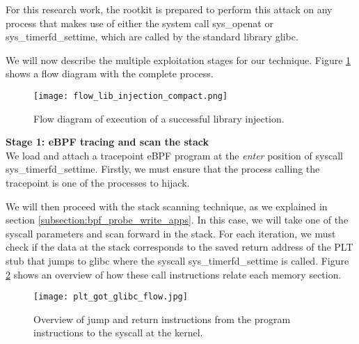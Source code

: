 For this research work, the rootkit is prepared to perform this attack on any process that makes use of either the system call sys\_openat or sys\_timerfd\_settime, which are called by the standard library glibc.

We will now describe the multiple exploitation stages for our technique. Figure \ref{fig:flow_lib_injection_compact} shows a flow diagram with the complete process.

\begin{figure}[htbp]
	\centering
	\texttt{[image: flow\_lib\_injection\_compact.png]}
	\caption{Flow diagram of execution of a successful library injection.}
	\label{fig:flow_lib_injection_compact}
\end{figure}

\textbf{Stage 1: eBPF tracing and scan the stack}\\
We load and attach a tracepoint eBPF program at the \textit{enter} position of syscall sys\_timerfd\_settime. Firstly, we must ensure that the process calling the tracepoint is one of the processes to hijack.

We will then proceed with the stack scanning technique, as we explained in section \ref{subsection:bpf_probe_write_apps}. In this case, we will take one of the syscall parameters and scan forward in the stack. For each iteration, we must check if the data at the stack corresponds to the saved return address of the PLT stub that jumps to glibc where the syscall sys\_timerfd\_settime is called. Figure \ref{fig:lib_stage1} shows an overview of how these call instructions relate each memory section. 


\begin{figure}[htbp]
	\centering
	\texttt{[image: plt\_got\_glibc\_flow.jpg]}
	\caption{Overview of jump and return instructions from the program instructions to the syscall at the kernel.}
	\label{fig:lib_stage1}
\end{figure}

